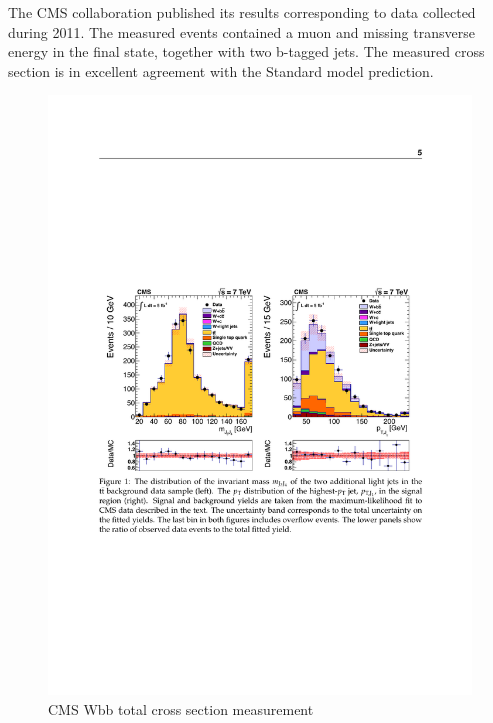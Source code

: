 The CMS collaboration published its results corresponding to data collected during 2011. The measured events contained a muon and missing transverse energy in the final state, together with two b-tagged jets. The measured cross section is in excellent agreement with the Standard model prediction.\citep{Chatrchyan:2013uza}

\begin{figure}[htbp]
	\centering
		\includegraphics{Figures/cms_tot.pdf}
	\caption[CMS Wbb total cross section measurement]{CMS Wbb total cross section measurement\cite{Chatrchyan:2013uza} }
	\label{fig:cms_total}
\end{figure}